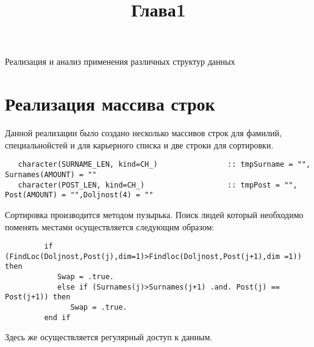 
\title{Глава1}

\chaptername{ Реализация и анализ применения различных структур данных}
\section{Реализация массива строк}
 Данной реализации было создано несколько массивов строк для фамилий, специальнойстей и для карьерного списка и две строки для сортировки.
\begin{lstlisting}
   character(SURNAME_LEN, kind=CH_)                :: tmpSurname = "", Surnames(AMOUNT) = ""
   character(POST_LEN, kind=CH_)                   :: tmpPost = "", Post(AMOUNT) = "",Doljnost(4) = ""
\end{lstlisting}
   Сортировка производится методом пузырька. Поиск людей который необходимо поменять местами осуществляется следующим образом:
\begin{lstlisting}
         if (FindLoc(Doljnost,Post(j),dim=1)>Findloc(Doljnost,Post(j+1),dim =1)) then
            Swap = .true.
            else if (Surnames(j)>Surnames(j+1) .and. Post(j) == Post(j+1)) then
               Swap = .true.
         end if
\end{lstlisting}
  Здесь же осуществляется регулярный доступ к данным.

